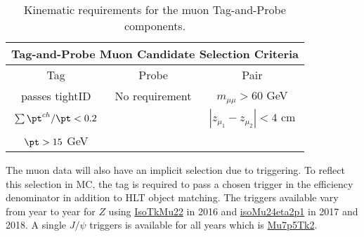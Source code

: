 \begin{table}
\small
\caption{Kinematic requirements for the muon Tag-and-Probe components.}
\label{tab:mutpnselect}
\centering
\begin{tabular}{|c|c|c|}
\hline 
\multicolumn{3}{|c|}{Tag-and-Probe Muon Candidate Selection Criteria} \\ 
\hline 
\hline
Tag & Probe & Pair \\ 
\hline 
\hline
passes tightID & No requirement & $m_{\mu\mu} > 60$ GeV \\
$\sum \pt^{ch} / \pt < 0.2$ & &  $|z_{\mu_1} - z_{\mu_2}| <4 $ cm \\
$\pt > 15$ GeV &   &   \\
\hline 
\end{tabular} 
\end{table}

The muon data will also  have an implicit selection due to triggering. To reflect this selection in MC, the tag is required to pass a chosen trigger in the efficiency denominator in addition to HLT object matching. The triggers available vary from year to year for $Z$ using \url{IsoTkMu22} in 2016 and \url{isoMu24eta2p1} in 2017 and 2018. A single $J/\psi$ triggers is available for all years which is \url{Mu7p5Tk2}.\\






